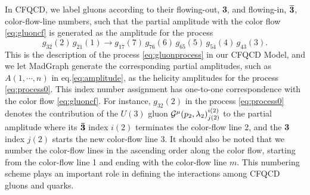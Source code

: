\documentclass[a4paper,11pt]{article}
\begin{document}
 In CFQCD, we label
 gluons according to their flowing-out, {\bf 3}, and flowing-in,
 $\overline{{\bf 3}}$,
 color-flow-line numbers, such that the partial amplitude
 with the color flow \eqref{eq:gluoncf} is generated as the
 amplitude for the process
\begin{equation}
g_{32}(2)\,g_{21}(1)\rightarrow
 g_{17}(7)\,g_{76}(6)\,g_{65}(5)\,g_{54}(4)\,g_{43}(3).
 \label{eq:process0}
\end{equation}
This is the description of the process \eqref{eq:gluonprocess} in our
CFQCD Model, and we let MadGraph generate the corresponding partial
amplitudes, such as $A(1,\cdots,n)$ in eq.\eqref{eq:amplitude}, as the
helicity amplitudes for the process \eqref{eq:process0}. This index number assignment has one-to-one correspondence
with the color flow \eqref{eq:gluoncf}. For instance, $g_{32}(2)$
in the process \eqref{eq:process0} denotes the contribution of the $U(3)$ gluon
${\cal G}^{\mu}(p_2,\lambda _2)_{j(2)}^{i(2)}$ to the partial amplitude where its
${\bf \bar{3}}$ index $i(2)$ terminates the color-flow line 2, and the
{\bf 3} index $j(2)$ starts the new color-flow line 3. It should also be noted
that we number the color-flow lines in the ascending order along the
color flow, starting from the color-flow line 1 and ending with the
color-flow line $m$. This numbering scheme plays an important role in defining
the interactions among CFQCD gluons and quarks.
\end{document}
